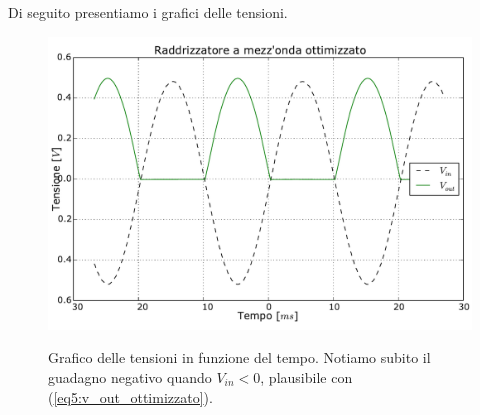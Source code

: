 Di seguito presentiamo i grafici delle tensioni.

\begin{figure}[ht]
 \centering
   {\includegraphics[width=14.5cm]{../E05/latex/radd_ott.pdf}}
 \caption{Grafico delle tensioni in funzione del tempo. Notiamo subito il guadagno negativo quando $V_{in}<0$, plausibile con (\ref{eq5:v_out_ottimizzato}).}
 \label{gr5:primo_raddrizzatore_vin}
\end{figure}
